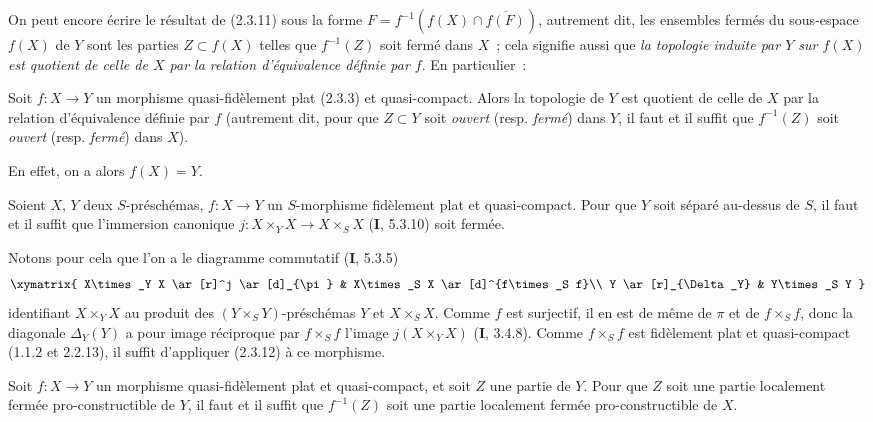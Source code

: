 On peut encore écrire le résultat de (2.3.11) sous la forme
$F=f^{-1}(f(X)\cap\overline{f(F)})$, autrement dit, les ensembles fermés du
sous-espace $f(X)$ de $Y$ sont les parties $Z\subset f(X)$ telles que
$f^{-1}(Z)$ soit fermé dans $X$~; cela signifie aussi que \emph{la topologie
induite par $Y$ sur $f(X)$ est quotient de celle de $X$ par la relation
d'équivalence définie par $f$}. En particulier~:

\begin{corollary}[2.3.12]
\label{IV.2.3.12-fr}
Soit $f:X\to Y$ un morphisme quasi-fidèlement plat \textup{(2.3.3)} et quasi-compact.
Alors la topologie de $Y$ est quotient de celle de $X$ par la relation
d'équivalence définie par $f$ \textup{(autrement dit, pour que $Z\subset Y$ soit
\emph{ouvert} (resp. \emph{fermé}) dans $Y$, il faut et il suffit que $f^{-1}(Z)$ soit
\emph{ouvert} (resp. \emph{fermé}) dans $X$)}.
\end{corollary}

En effet, on a alors $f(X)=Y$.

\begin{corollary}[2.3.13]
\label{IV.2.3.13-fr}
Soient $X$, $Y$ deux $S$-préschémas, $f:X\to Y$ un $S$-morphisme fidèlement
plat et quasi-compact. Pour que $Y$ soit séparé au-dessus de $S$, il faut et il
suffit que l'immersion canonique
$j:X\times_Y X\to X\times_S X$ \textup{(\textbf{I}, 5.3.10)} soit fermée.
\end{corollary}

Notons pour cela que l'on a le diagramme commutatif (\textbf{I}, 5.3.5)
\[
\xymatrix{
  X\times_Y X \ar[r]^j \ar[d]_{\pi} &
  X\times_S X \ar[d]^{f\times_S f}\\
  Y \ar[r]_{\Delta_Y} & Y\times_S Y
}
\]
identifiant $X\times_Y X$ au produit des $(Y\times_S Y)$-préschémas $Y$ et
$X\times_S X$. Comme $f$ est surjectif, il en est de même de $\pi$ et de
$f\times_S f$, donc la diagonale $\Delta_Y(Y)$ a pour image réciproque par
$f\times_S f$ l'image $j(X\times_Y X)$ (\textbf{I}, 3.4.8). Comme $f\times_S f$ est
fidèlement plat et quasi-compact (1.1.2 et 2.2.13), il suffit d'appliquer
(2.3.12) à ce morphisme.

\begin{corollary}[2.3.14]
\label{IV.2.3.14-fr}
Soit $f:X\to Y$ un morphisme quasi-fidèlement plat et quasi-compact, et soit
$Z$ une partie de $Y$. Pour que $Z$ soit une partie localement fermée
pro-constructible de $Y$, il faut et il suffit que $f^{-1}(Z)$ soit une partie
localement fermée pro-constructible de $X$.
\end{corollary}

